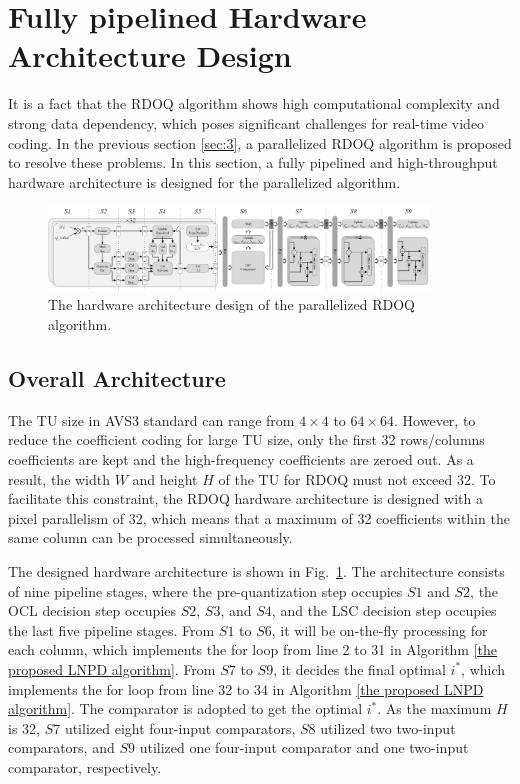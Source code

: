 \documentclass[lettersize,journal]{IEEEtran}
\begin{document}
\section{Fully pipelined Hardware Architecture Design}
It is a fact that the RDOQ algorithm shows high computational complexity and strong data dependency, which poses significant challenges for real-time video coding. In the previous section \ref{sec:3}, a parallelized RDOQ algorithm is proposed to resolve these problems. In this section, a fully pipelined and high-throughput hardware architecture is designed for the parallelized algorithm. 
\par
\begin{figure}[htbp]
	\centering
	\centerline{\includegraphics[width=0.90\textwidth]{pic_pan/overall_architecture.png}} 
	\caption{The hardware architecture design of the parallelized RDOQ algorithm.}
	\label{overall_architecture} %
\end{figure}

\subsection{Overall Architecture}
The TU size in AVS3 standard can range from $4\times4$ to $64\times64$. However, to reduce the coefficient coding for large TU size, only the first 32 rows/columns coefficients are kept and the high-frequency coefficients are zeroed out. As a result, the width $W$ and height $H$ of the TU for RDOQ must not exceed 32. To facilitate this constraint, the RDOQ hardware architecture is designed with a pixel parallelism of 32, which means that a maximum of 32 coefficients within the same column can be processed simultaneously. 

The designed hardware architecture is shown in Fig.~\ref{overall_architecture}. The architecture consists of nine pipeline stages, where the pre-quantization step occupies $S1$ and $S2$, the OCL decision step occupies $S2$, $S3$, and $S4$, and the LSC decision step occupies the last five pipeline stages. From $S1$ to $S6$, it will be on-the-fly processing for each column, which implements the for loop from line 2 to 31 in Algorithm \ref{the proposed LNPD algorithm}. From $S7$ to $S9$, it decides the final optimal $i_{}^{*}$, which implements the for loop from line 32 to 34 in Algorithm \ref{the proposed LNPD algorithm}. The comparator is adopted to get the optimal $i_{}^{*}$. As the maximum $H$ is 32, $S7$ utilized eight four-input comparators, $S8$ utilized two two-input comparators, and $S9$ utilized one four-input comparator and one two-input comparator, respectively. %
\end{document}
